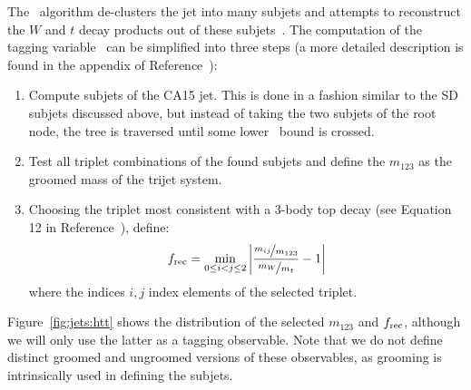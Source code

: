 The \HTT~algorithm de-clusters the jet into many subjets and attempts to reconstruct the $W$ and $t$ decay products out of these subjets~\needcite.
The computation of the tagging variable \frec~can be simplified into three steps (a more detailed description is found in the appendix of Reference~\needcite):
\begin{enumerate}
    \item Compute subjets of the CA15 jet. This is done in a fashion similar to the SD subjets discussed above, but instead of taking the two subjets of the root node, the tree is traversed until some lower \pt~bound is crossed.
    \item Test all triplet combinations of the found subjets and define the $m_{123}$ as the groomed mass of the trijet system. 
    \item Choosing the triplet most consistent with a 3-body top decay (see Equation 12 in Reference~\needcite), define:
        \begin{equation}
            f_\mathrm{rec} = \min_{0\leq i < j \leq 2} \left|
            \frac{\nicefrac{m_{ij}}{m_{123}}}{\nicefrac{m_W}{m_t}} - 1\right|
        \end{equation}
        where the indices $i,j$ index elements of the selected triplet. 
\end{enumerate}
Figure~\ref{fig:jets:htt} shows the distribution of the selected $m_{123}$ and $f_\mathrm{rec}$, although we will only use the latter as a tagging observable. 
Note that we do not define distinct groomed and ungroomed versions of these observables, as grooming is intrinsically used in defining the subjets. 

